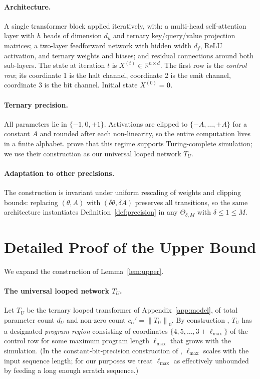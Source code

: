 \documentclass{article}
\theoremstyle{definition}
\newcommand{\R}{\mathbb{R}}
\newcommand{\norm}[1]{\left\lVert#1\right\rVert}
\newcommand{\Param}{\Theta}
\begin{document}
\paragraph{Architecture.} A single transformer block applied iteratively, with: a multi-head
self-attention layer with $h$ heads of dimension $d_h$ and ternary
key/query/value projection matrices; a two-layer feedforward network with
hidden width $d_f$, ReLU activation, and ternary weights and biases; and
residual connections around both sub-layers. The state at iteration $t$ is
$X^{(t)} \in \R^{n \times d}$. The first row is the \emph{control row}; its
coordinate 1 is the halt channel, coordinate 2 is the emit channel, coordinate
3 is the bit channel. Initial state $X^{(0)} = \mathbf{0}$.

\paragraph{Ternary precision.} All parameters lie in $\{-1, 0, +1\}$. Activations are clipped to $\{-A,
  \ldots, +A\}$ for a constant $A$ and rounded after each non-linearity, so the
entire computation lives in a finite alphabet. \citet{li2025constant} prove
that this regime supports Turing-complete simulation; we use their construction
as our universal looped network $T_U$.

\paragraph{Adaptation to other precisions.} The construction is invariant under uniform rescaling of weights and clipping
bounds: replacing $(\theta, A)$ with $(\delta \theta, \delta A)$ preserves all
transitions, so the same architecture instantiates
Definition~\ref{def:precision} in any $\Param_{\delta, M}$ with $\delta \le 1
  \le M$.

\section{Detailed Proof of the Upper Bound}\label{app:upper}

We expand the construction of Lemma~\ref{lem:upper}.

\paragraph{The universal looped network $T_U$.} Let $T_U$ be the ternary looped transformer of Appendix~\ref{app:model}, of
total parameter count $d_U$ and non-zero count $c_U' = \norm{T_U}_0$. By
construction \citep{li2025constant}, $T_U$ has a designated \emph{program
  region} consisting of coordinates $\{4, 5, \ldots, 3 + \ell_{\max}\}$ of the
control row for some maximum program length $\ell_{\max}$ that grows with the
simulation. (In the constant-bit-precision construction of
\citet{li2025constant}, $\ell_{\max}$ scales with the input sequence length;
for our purposes we treat $\ell_{\max}$ as effectively unbounded by feeding a
long enough scratch sequence.)
\end{document}
